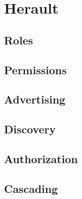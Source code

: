\chapter{Herault}

\section{Roles}

\section{Permissions}

\section{Advertising}

\section{Discovery}

\section{Authorization}

\section{Cascading}

